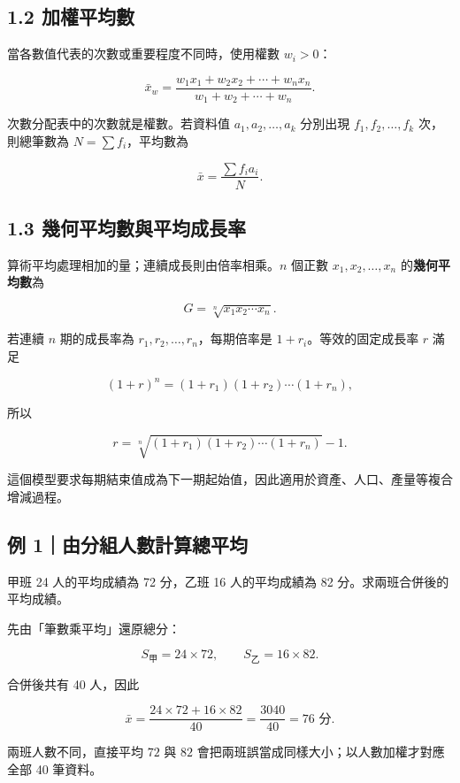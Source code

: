\documentclass[11pt,a4paper]{article}
\begin{document}
\subsection{1.2 加權平均數}\label{ux52a0ux6b0aux5e73ux5747ux6578}

當各數值代表的次數或重要程度不同時，使用權數 \(w_i>0\)：

\[
\boxed{\bar{x}_w=\frac{w_1x_1+w_2x_2+\cdots+w_nx_n}{w_1+w_2+\cdots+w_n}}.
\]

次數分配表中的次數就是權數。若資料值 \(a_1,a_2,\ldots,a_k\) 分別出現 \(f_1,f_2,\ldots,f_k\) 次，則總筆數為 \(N=\sum f_i\)，平均數為

\[
\bar{x}=\frac{\sum f_i a_i}{N}.
\]

\subsection{1.3 幾何平均數與平均成長率}\label{ux5e7eux4f55ux5e73ux5747ux6578ux8207ux5e73ux5747ux6210ux9577ux7387}

算術平均處理相加的量；連續成長則由倍率相乘。\(n\) 個正數 \(x_1,x_2,\ldots,x_n\) 的\textbf{幾何平均數}為

\[
\boxed{G=\sqrt[n]{x_1x_2\cdots x_n}}.
\]

若連續 \(n\) 期的成長率為 \(r_1,r_2,\ldots,r_n\)，每期倍率是 \(1+r_i\)。等效的固定成長率 \(r\) 滿足

\[
(1+r)^n=(1+r_1)(1+r_2)\cdots(1+r_n),
\]

所以

\[
\boxed{r=\sqrt[n]{(1+r_1)(1+r_2)\cdots(1+r_n)}-1}.
\]

這個模型要求每期結束值成為下一期起始值，因此適用於資產、人口、產量等複合增減過程。

\subsection{例 1｜由分組人數計算總平均}\label{ux4f8b-1ux7531ux5206ux7d44ux4ebaux6578ux8a08ux7b97ux7e3dux5e73ux5747}

甲班 24 人的平均成績為 72 分，乙班 16 人的平均成績為 82 分。求兩班合併後的平均成績。

先由「筆數乘平均」還原總分：

\[
S_{\text{甲}}=24\times72,\qquad S_{\text{乙}}=16\times82.
\]

合併後共有 40 人，因此

\[
\bar{x}=\frac{24\times72+16\times82}{40}
=\frac{3040}{40}=\boxed{76\text{ 分}}.
\]

兩班人數不同，直接平均 \(72\) 與 \(82\) 會把兩班誤當成同樣大小；以人數加權才對應全部 40 筆資料。
\end{document}
